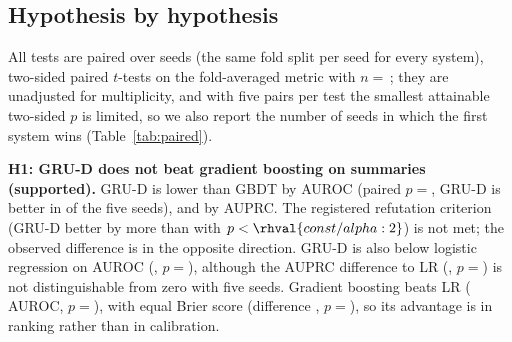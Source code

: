 \subsection{Hypothesis by hypothesis}
All tests are paired over seeds (the same fold split per seed for every system), two-sided paired $t$-tests on the fold-averaged metric with $n=$\,; they are unadjusted for multiplicity, and with five pairs per test the smallest attainable two-sided $p$ is limited, so we also report the number of seeds in which the first system wins (Table~\ref{tab:paired}).

\begin{table}[t]\centering\caption{Paired differences at 48 h (first system minus second; wins = seeds with the first system better, of ). $p$: paired $t$-test on AUROC; $p_{\mathrm{Br}}$: on Brier score (negative $\Delta$Brier favours the first system).}\label{tab:paired}
\end{table}

\textbf{H1: GRU-D does not beat gradient boosting on summaries (supported).} GRU-D is lower than GBDT by  AUROC (paired $p=$, GRU-D is better in  of the five seeds), and by  AUPRC. The registered refutation criterion (GRU-D better by more than  with $p<\rhval{const/alpha:2}$) is not met; the observed difference is in the opposite direction. GRU-D is also below logistic regression on AUROC (, $p=$), although the AUPRC difference to LR (, $p=$) is not distinguishable from zero with five seeds. Gradient boosting beats LR ( AUROC, $p=$), with equal Brier score (difference , $p=$), so its advantage is in ranking rather than in calibration.

